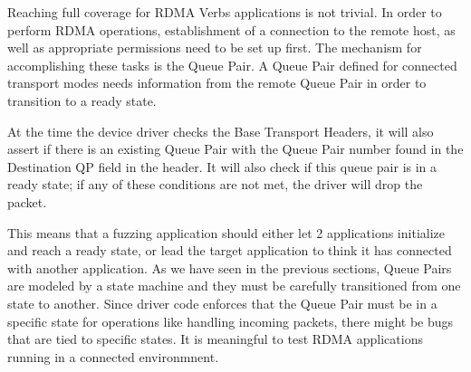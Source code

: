 Reaching full coverage for RDMA Verbs applications is not trivial. In order to perform RDMA operations, establishment of
a connection to the remote host, as well as appropriate permissions need to be set up first. The mechanism for accomplishing
these tasks is the Queue Pair\cite{rdmamanual}. A Queue Pair defined for connected transport modes needs information from
the remote Queue Pair in order to transition to a ready state.

At the time the device driver checks the Base Transport Headers, it will also assert if there is an existing Queue Pair
with the Queue Pair number found in the Destination QP field in the header.
It will also check if this queue pair is in a ready state; if any of these conditions
are not met, the driver will drop the packet.

This means that a fuzzing application should either let 2 applications initialize and reach a ready state,
or lead the target application to think it has connected with another application. As we have seen
in the previous sections, Queue Pairs are modeled by a state machine and they must be carefully transitioned from one
state to another. Since driver code enforces that the Queue Pair must be in a specific state for operations like
handling incoming packets, there might be bugs that are tied to specific states. It is meaningful to test
RDMA applications running in a connected environmnent.








